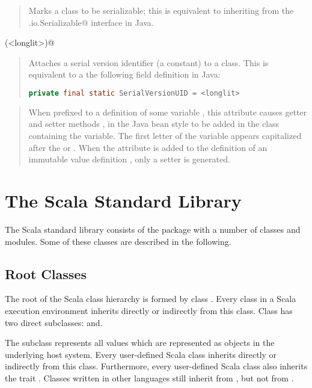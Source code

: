 {{{\lstinline@serializable@
\begin{quote}Marks a class to be serializable; this is
equivalent to inheriting from the 
\lstinline@java.io.Serializable@ interface
in Java.
\end{quote}

\lstinline@SerialVersionUID(<longlit>)@
\begin{quote}Attaches a serial version identifier (a
\lstinline@long@ constant) to a class.
This is equivalent to a the following field
definition in Java:
\begin{lstlisting}[language=Java]
  private final static SerialVersionUID = <longlit> 
\end{lstlisting}
\end{quote}

\lstinline@beanProperty@
\begin{quote}
When prefixed to a definition of some variable , this
attribute causes getter and setter methods ,  in
the Java bean style to be added in the class containing the
variable. The first letter of the variable appears capitalized after
the  or . When the attribute is added to the
definition of an immutable value definition , only a setter is
generated.
\end{quote}


\chapter{The Scala Standard Library}

The Scala standard library consists of the package  with a
number of classes and modules. Some of these classes are described in
the following.

\section{Root Classes}
\label{sec:cls-root}
\label{sec:cls-any}
\label{sec:cls-object}

The root of the Scala class hierarchy is formed by class .
Every class in a Scala execution environment inherits directly or
indirectly from this class.  Class  has two direct
subclasses:  and.

The subclass  represents all values which are represented
as objects in the underlying host system. Every user-defined Scala
class inherits directly or indirectly from this class. Furthermore,
every user-defined Scala class also inherits the trait
.  Classes written in other languages still
inherit from , but not from
.

}}}
